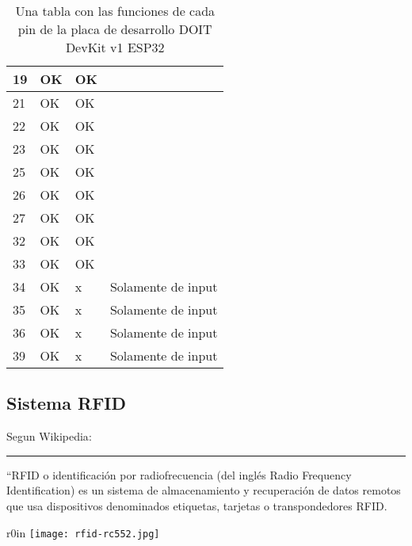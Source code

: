 \documentclass[../informe_krapp.tex]{subfiles}
\begin{document}
\begin{table}[!ht]
\begin{tabular}{|l|l|l|l|}
		19   & OK        & OK     & ~                                          \\ \hline
		21   & OK        & OK     & ~                                          \\ \hline
		22   & OK        & OK     & ~                                          \\ \hline
		23   & OK        & OK     & ~                                          \\ \hline
		25   & OK        & OK     & ~                                          \\ \hline
		26   & OK        & OK     & ~                                          \\ \hline
		27   & OK        & OK     & ~                                          \\ \hline
		32   & OK        & OK     & ~                                          \\ \hline
		33   & OK        & OK     & ~                                          \\ \hline
		34   & OK        & x      & Solamente de input                         \\ \hline
		35   & OK        & x      & Solamente de input                         \\ \hline
		36   & OK        & x      & Solamente de input                         \\ \hline
		39   & OK        & x      & Solamente de input                         \\ \hline
	\end{tabular}
	\caption{Una tabla con las funciones de cada pin de la placa de desarrollo
		DOIT DevKit v1 ESP32}
	\label{tabla-pines-esp32}
\end{table}

\clearpage
\subsection{Sistema RFID}
Segun Wikipedia\cite{wikipedia_rfid_es}:

\begin{center}
	\rule{0.8\textwidth}{0.3pt}
\end{center}
``RFID o identificación por radiofrecuencia
(del inglés Radio Frequency Identification) es un sistema de almacenamiento y recuperación
de datos remotos que usa dispositivos denominados etiquetas, tarjetas o transpondedores
RFID.

\begin{wrapfigure}{r}{0in}
	\centering
	\texttt{[image: rfid-rc552.jpg]}
\end{wrapfigure}
\end{document}
